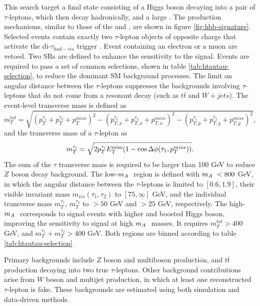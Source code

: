 This search target a final state consisting of a Higgs boson decaying into a pair of $\tau$-leptons, which then decay hadronically, and a large \met \cite{HDBS-2018-50}. The production mechanisms, similar to those of the \monohbb and \monohgamgam, are shown in figure \ref{fig:hbb-signature}. Selected events contain exactly two $\tau$-lepton objects of opposite charge that activate the di-$\tau_{had-vis}$ trigger \cite{ATLAS-CONF-2017-061}. Event containing an electron or a muon are vetoed. Two SRs are defined to enhance the sensitivity to the \thdma signal. Events are required to pass a set of common selections, shown in table \ref{tab:htautau-selection}, to reduce the dominant SM background processes. The limit on angular distance between the $\tau$-leptons suppresses the backgrounds involving $\tau$-leptons that do not come from a resonant decay (such as $t\bar{t}$ and $W+jets$). The event-level transverse mass is defined as 
\begin{equation}
    \label{4.11}
    m_T^{tot} = \sqrt{(p_T^{\tau_1} + p_T^{\tau_2} + p_T^{miss})^2 - (p_{T,x}^{\tau_1} + p_{T,x}^{\tau_2} + p_{T,x}^{miss})^2 - (p_{T,y}^{\tau_1} + p_{T,y}^{\tau_2} + p_{T,y}^{miss})^2},
\end{equation}
and the transverse mass of a $\tau$-lepton as
\begin{equation}
    \label{4.12}
    m_T^{\tau_i} = \sqrt{2p_T^{\tau_i}E_{\mathrm{T}}^{\mathrm{miss}}(1-\cos\Delta\phi(\tau_1, p_T^{miss}))}.
\end{equation}
The sum of the $\tau$ transverse mass is required to be larger than 100 GeV to reduce $Z$ boson decay background. The low-$m_A~$ region is defined with $m_A~<800$ GeV, in which the angular distance between the $\tau$-leptons is limited to $[0.6,1.9]$, their visible invariant mass $m_{vis}(\tau_1,\tau_2)$ to $[75, \infty]$ GeV, and the individual transverse mass $m_T^{\tau_1}$, $m_T^{\tau_2}$ to $>50$ GeV and $>25$ GeV, respectively. The high-$m_A~$ corresponds to signal events with higher \met and boosted Higgs boson, improving the sensitivity to \thdma signal at high $m_A~$ masses. It requires $m_T^{tot}>400$ GeV, and $m_T^{\tau_1} + m_T^{\tau_2}>400$ GeV. Both regions are binned according to table \ref{tab:htautau-selection}

Primary backgrounds include $Z$ boson and multiboson production, and $t\bar{t}$ production decaying into two true $\tau$-leptons. Other background contributions arise from $W$ boson and multijet production, in which at least one reconstructed $\tau$-lepton is fake. These backgrounds are estimated using both simulation and data-driven methods. 
 
